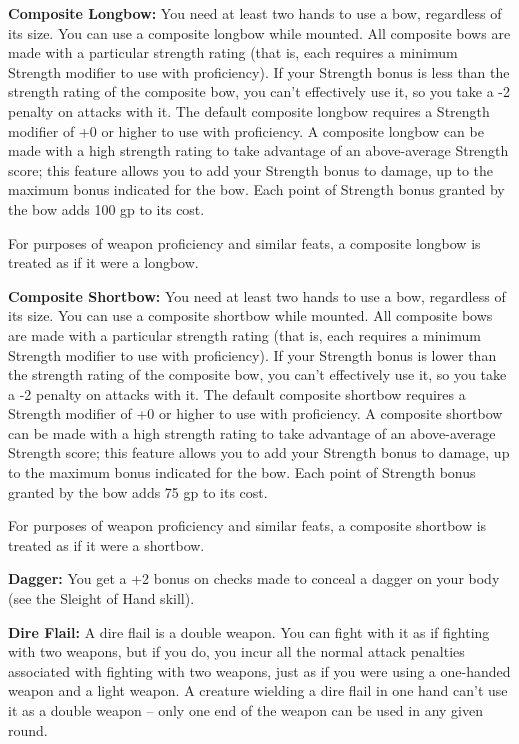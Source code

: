 \textbf{Composite Longbow:} You need at least two hands to use a bow, regardless 
of its size. You can use a composite longbow while mounted. All composite bows 
are made with a particular strength rating (that is, each requires a minimum Strength 
modifier to use with proficiency). If your Strength bonus is less than the strength 
rating of the composite bow, you can't effectively use it, so you take a -2 penalty 
on attacks with it. The default composite longbow requires a Strength modifier 
of +0 or higher to use with proficiency. A composite longbow can be made with a 
high strength rating to take advantage of an above-average Strength score; this 
feature allows you to add your Strength bonus to damage, up to the maximum bonus 
indicated for the bow. Each point of Strength bonus granted by the bow adds 100 
gp to its cost.

For purposes of weapon proficiency and similar feats, a composite longbow is treated 
as if it were a longbow.

\textbf{Composite Shortbow:} You need at least two hands to use a bow, regardless 
of its size. You can use a composite shortbow while mounted. All composite bows 
are made with a particular strength rating (that is, each requires a minimum Strength 
modifier to use with proficiency). If your Strength bonus is lower than the strength 
rating of the composite bow, you can't effectively use it, so you take a -2 penalty 
on attacks with it. The default composite shortbow requires a Strength modifier 
of +0 or higher to use with proficiency. A composite shortbow can be made with 
a high strength rating to take advantage of an above-average Strength score; this 
feature allows you to add your Strength bonus to damage, up to the maximum bonus 
indicated for the bow. Each point of Strength bonus granted by the bow adds 75 
gp to its cost. 

For purposes of weapon proficiency and similar feats, a composite shortbow is treated 
as if it were a shortbow.

\textbf{Dagger:} You get a +2 bonus on  checks made to conceal a 
dagger on your body (see the Sleight of Hand skill).

\textbf{Dire Flail:} A dire flail is a double weapon. You can fight with it as 
if fighting with two weapons, but if you do, you incur all the normal attack penalties 
associated with fighting with two weapons, just as if you were using a one-handed 
weapon and a light weapon. A creature wielding a dire flail in one hand can't use 
it as a double weapon --  only one end of the weapon can be used in any given round.

